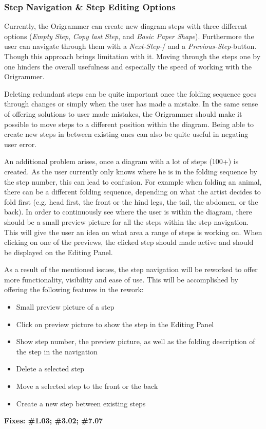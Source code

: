 \subsubsection{Step Navigation \& Step Editing Options}

Currently, the Origrammer can create new diagram steps with three different options (\emph{Empty Step}, \emph{Copy last Step}, and \emph{Basic Paper Shape}). Furthermore the user can navigate through them with a \emph{Next-Step}-/ and a \emph{Previous-Step}-button. Though this approach brings limitation with it. Moving through the steps one by one hinders the overall usefulness and especially the speed of working with the Origrammer.

Deleting redundant steps can be quite important once the folding sequence goes through changes or simply when the user has made a mistake. In the same sense of offering solutions to user made mistakes, the Origrammer should make it possible to move steps to a different position within the diagram. Being able to create new steps in between existing ones can also be quite useful in negating user error.

An additional problem arises, once a diagram with a lot of steps (100+) is created. As the user currently only knows where he is in the folding sequence by the step number, this can lead to confusion. For example when folding an animal, there can be a different folding sequence, depending on what the artist decides to fold first (e.g. head first, the front or the hind legs, the tail, the abdomen, or the back). In order to continuously see where the user is within the diagram, there should be a small preview picture for all the steps within the step navigation. This will give the user an idea on what area a range of steps is working on. When clicking on one of the previews, the clicked step should made active and should be displayed on the Editing Panel.

As a result of the mentioned issues, the step navigation will be reworked to offer more functionality, visibility and ease of use. This will be accomplished by offering the following features in the rework:

\begin{itemize}
\item Small preview picture of a step
\item Click on preview picture to show the step in the Editing Panel
\item Show step number, the preview picture, as well as the folding description of the step in the navigation
\item Delete a selected step
\item Move a selected step to the front or the back
\item Create a new step between existing steps
\end{itemize}

\textbf{Fixes: \#1.03; \#3.02;   \#7.07}
